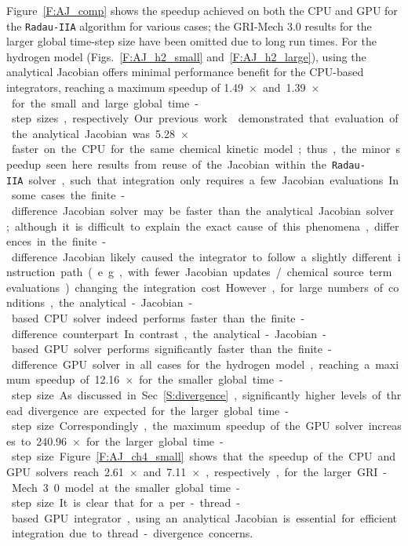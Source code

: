 \documentclass[preprint,review,11pt]{elsarticle}
\begin{document}
Figure~\ref{F:AJ_comp} shows the speedup achieved on both the CPU and GPU for the \texttt{Radau-IIA} algorithm for various cases; the GRI-Mech 3.0 results for the larger global time-step size have been omitted due to long run times.
For the hydrogen model (Figs.~\ref{F:AJ_h2_small} and~\ref{F:AJ_h2_large}), using the analytical Jacobian offers minimal performance benefit for the CPU-based integrators, reaching a maximum speedup of \SI{1.49}{$\times$} and \SI{1.39}{$\times$} for the small and large global time-step sizes, respectively.
Our previous work~\cite{Niemeyer:2016aa} demonstrated that evaluation of the analytical Jacobian was \SI{5.28}{$\times$} faster on the CPU for the same chemical kinetic model; thus, the minor speedup seen here results from reuse of the Jacobian within the \texttt{Radau-IIA} solver, such that integration only requires a few Jacobian evaluations.
In some cases the finite-difference Jacobian solver may be faster than the analytical Jacobian solver; although it is difficult to explain the exact cause of this phenomena, differences in the finite-difference Jacobian likely caused the integrator to follow a slightly different instruction path (e.g., with fewer Jacobian updates\slash chemical source term evaluations) changing the integration cost.
However, for large numbers of conditions, the analytical-Jacobian-based CPU solver indeed performs faster than the finite-difference counterpart.
In contrast, the analytical-Jacobian-based GPU solver performs significantly faster than the finite-difference GPU solver in all cases for the hydrogen model, reaching a maximum speedup of \SI{12.16}{$\times$} for the smaller global time-step size.
As discussed in Sec.~\ref{S:divergence}, significantly higher levels of thread divergence are expected for the larger global time-step size.
Correspondingly, the maximum speedup of the GPU solver increases to \SI{240.96}{$\times$} for the larger global time-step size.
Figure~\ref{F:AJ_ch4_small} shows that the speedup of the CPU and GPU solvers reach \SI{2.61}{$\times$} and \SI{7.11}{$\times$}, respectively, for the larger GRI-Mech 3.0 model at the smaller global time-step size.
It is clear that for a per-thread-based GPU integrator, using an analytical Jacobian is essential for efficient integration due to thread-divergence concerns.
\end{document}
